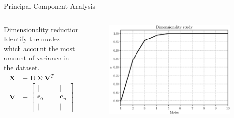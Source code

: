 \begin{frame}{Principal Component Analysis}
    \begin{columns}
            \vspace{1cm}
            \begin{block}{Dimensionality reduction}
                Identify the modes which account the most amount of variance in the dataset.
                \begin{align*}
                    \boldsymbol{X} & = \boldsymbol{U} \ \boldsymbol{\Sigma} \ \boldsymbol{V}^T \\
                    \boldsymbol{V} & = 
                        \begin{bmatrix}
                            \lvert & & \lvert \\
                            \boldsymbol{c}_0 & ... & \boldsymbol{c}_n \\ 
                            \lvert & & \lvert  
                        \end{bmatrix} 
                \end{align*}
            \end{block}
            
            \vspace{-0.2cm}
            \begin{figure}
                \centering
                \includegraphics[scale=0.25]{./images/PCAmodes.eps}
            \end{figure}
    \end{columns}
\end{frame}

